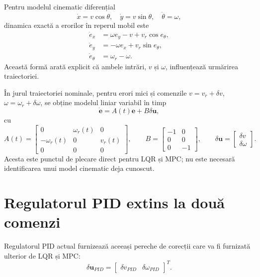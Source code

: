 \documentclass[12pt,a4paper]{article}
\begin{document}
Pentru modelul cinematic diferențial
\begin{equation}
  \dot{x}=v\cos\theta,\quad
  \dot{y}=v\sin\theta,\quad
  \dot{\theta}=\omega,
\end{equation}
dinamica exactă a erorilor în reperul mobil este
\begin{align}
  \dot e_x &= \omega e_y-v+v_r\cos e_{\theta},\\
  \dot e_y &= -\omega e_x+v_r\sin e_{\theta},\\
  \dot e_{\theta} &= \omega_r-\omega.
\end{align}
Această formă arată explicit că ambele intrări, $v$ și $\omega$, influențează
urmărirea traiectoriei.

În jurul traiectoriei nominale, pentru erori mici și comenzile
$v=v_r+\delta v$, $\omega=\omega_r+\delta\omega$, se obține modelul liniar
variabil în timp
\begin{equation}
  \dot{\mathbf e}=A(t)\mathbf e+B\delta\mathbf u,
\end{equation}
cu
\begin{equation}
A(t)=
\begin{bmatrix}
0 & \omega_r(t) & 0\\
-\omega_r(t) & 0 & v_r(t)\\
0 & 0 & 0
\end{bmatrix},\qquad
B=
\begin{bmatrix}
-1 & 0\\
0 & 0\\
0 & -1
\end{bmatrix},\qquad
\delta\mathbf u=
\begin{bmatrix}\delta v\\\delta\omega\end{bmatrix}.
\end{equation}
Acesta este punctul de plecare direct pentru LQR și MPC; nu este necesară
identificarea unui model cinematic deja cunoscut.

\section{Regulatorul PID extins la două comenzi}

Regulatorul PID actual furnizează aceeași pereche de corecții care va fi
furnizată ulterior de LQR și MPC:
\begin{equation}
  \delta\mathbf u_{PID}=
  \begin{bmatrix}\delta v_{PID} & \delta\omega_{PID}\end{bmatrix}^{T}.
\end{equation}
\end{document}
